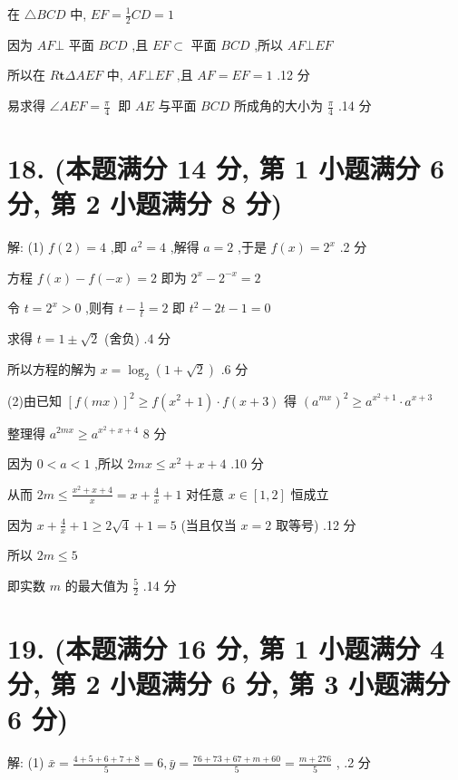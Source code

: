 \documentclass[10pt]{article}
\begin{document}
在 \(\bigtriangleup {BCD}\) 中, \({EF} = \frac{1}{2}{CD} = 1\)

因为 \({AF} \bot\) 平面 \({BCD}\) ,且 \({EF} \subset\) 平面 \({BCD}\) ,所以 \({AF} \bot  {EF}\)

所以在 \(R\mathbf{t}{\Delta AEF}\) 中, \({AF} \bot  {EF}\) ,且 \({AF} = {EF} = 1\) .12 分

易求得 \(\angle {AEF} = \frac{\pi }{4}\;\) 即 \({AE}\) 与平面 \({BCD}\) 所成角的大小为 \(\frac{\pi }{4}\) .14 分

\section*{18. (本题满分 14 分, 第 1 小题满分 6 分, 第 2 小题满分 8 分)}

解: (1) \(f\left( 2\right)  = 4\) ,即 \({a}^{2} = 4\) ,解得 \(a = 2\) ,于是 \(f\left( x\right)  = {2}^{x}\) .2 分

方程 \(f\left( x\right)  - f\left( {-x}\right)  = 2\) 即为 \({2}^{x} - {2}^{-x} = 2\)

令 \(t = {2}^{x} > 0\) ,则有 \(t - \frac{1}{t} = 2\) 即 \({t}^{2} - {2t} - 1 = 0\)

求得 \(t = 1 \pm  \sqrt{2}\) (舍负) .4 分

所以方程的解为 \(x = {\log }_{2}\left( {1 + \sqrt{2}}\right)\) .6 分

(2)由已知 \({\left\lbrack  f\left( mx\right) \right\rbrack  }^{2} \geq  f\left( {{x}^{2} + 1}\right)  \cdot  f\left( {x + 3}\right)\) 得 \({\left( {a}^{mx}\right) }^{2} \geq  {a}^{{x}^{2} + 1} \cdot  {a}^{x + 3}\)

整理得 \({a}^{2mx} \geq  {a}^{{x}^{2} + x + 4}\) 8 分

因为 \(0 < a < 1\) ,所以 \({2mx} \leq  {x}^{2} + x + 4\) .10 分

从而 \({2m} \leq  \frac{{x}^{2} + x + 4}{x} = x + \frac{4}{x} + 1\) 对任意 \(x \in  \left\lbrack  {1,2}\right\rbrack\) 恒成立

因为 \(x + \frac{4}{x} + 1 \geq  2\sqrt{4} + 1 = 5\) (当且仅当 \(x = 2\) 取等号) .12 分

所以 \({2m} \leq  5\)

即实数 \(m\) 的最大值为 \(\frac{5}{2}\) .14 分

\section*{19. (本题满分 16 分, 第 1 小题满分 4 分, 第 2 小题满分 6 分, 第 3 小题满分 6 分)}

解: (1) \(\bar{x} = \frac{4 + 5 + 6 + 7 + 8}{5} = 6,\bar{y} = \frac{{76} + {73} + {67} + m + {60}}{5} = \frac{m + {276}}{5}\) , .2 分
\end{document}
